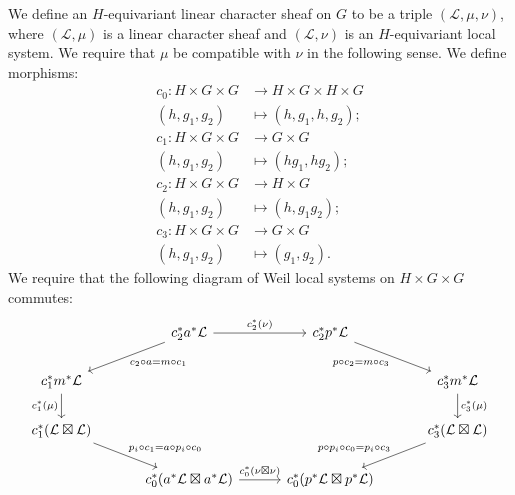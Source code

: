 \documentclass[10pt]{amsart}
\theoremstyle{plain}
\theoremstyle{definition}
\newcommand{\cs}[1]{{\mathcal{#1}}}
\begin{document}
We define an $H$-equivariant linear character sheaf on $G$ to be a triple $(\cs{L},\mu, \nu)$, where $(\cs{L},\mu)$ is a linear character sheaf and $(\cs{L},\nu)$ is an $H$-equivariant local system.  We require that $\mu$ be compatible with $\nu$ in the following sense.
We define morphisms:
\begin{align*}
c_0 : H\times G \times G &\to H\times G \times H \times G \\
(h,g_1,g_2) &\mapsto (h,g_1,h,g_2); \\
c_1 : H \times G\times G &\to G\times G \\
(h, g_1, g_2) &\mapsto (hg_1,hg_2); \\
c_2 : H \times G\times G &\to H\times G \\
(h,g_1,g_2) &\mapsto (h, g_1g_2); \\
c_3 : H \times G\times G &\to G\times G \\
(h, g_1, g_2) &\mapsto (g_1, g_2).
\end{align*}
We require that the following diagram of Weil local systems on $H \times G\times G$ commutes:
\begin{equation}\label{ECS1}
\begin{tikzcd}[column sep=30]
\ & \arrow{dl}{c_2\circ a = m\circ c_1}  c_2^* a^* \cs{L} \arrow{r}{c_2^*(\nu)} & c_2^* p^* \cs{L} \arrow{dr}[swap]{p\circ c_2 = m\circ c_3}  &  \\
\arrow{d}[swap]{c_1^*(\mu)} c_1^* m^* \cs{L} &&& c_3^* m^*\cs{L} \arrow{d}{c_3^*(\mu)} \\
c_1^*(\cs{L}\boxtimes \cs{L}) \arrow{dr}{p_i\circ c_1 = a\circ p_i\circ c_0} &&& \arrow{dl}[swap]{p\circ p_i\circ c_0 = p_i \circ c_3} c_3^*(\cs{L}\boxtimes \cs{L}) \\
 & c_0^*(a^*\cs{L}\boxtimes a^*\cs{L}) \arrow{r}{c_0^*(\nu\boxtimes \nu)} & c_0^*(p^*\cs{L} \boxtimes p^*\cs{L}) & 
\end{tikzcd}
\end{equation}

\end{document}
